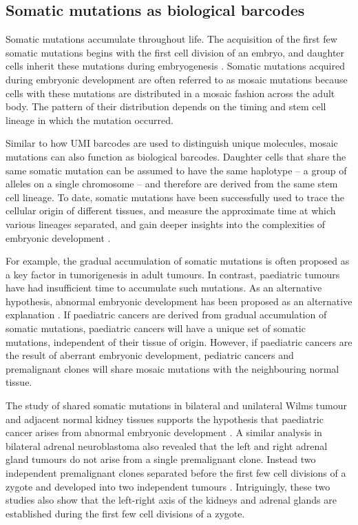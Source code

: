 \subsection{Somatic mutations as biological barcodes}

Somatic mutations accumulate throughout life. The acquisition of the first few somatic mutations begins with the first cell division of an embryo, and daughter cells inherit these mutations during embryogenesis \cite{Ju2017-vw}. Somatic mutations acquired during embryonic development are often referred to as mosaic mutations because cells with these mutations are distributed in a mosaic fashion across the adult body. The pattern of their distribution depends on the timing and stem cell lineage in which the mutation occurred. 

Similar to how UMI barcodes are used to distinguish unique molecules, mosaic mutations can also function as biological barcodes. Daughter cells that share the same somatic mutation can be assumed to have the same haplotype – a group of alleles on a single chromosome – and therefore are derived from the same stem cell lineage. To date, somatic mutations have been successfully used to trace the cellular origin of different tissues, and measure the approximate time at which various lineages separated, and gain deeper insights into the complexities of embryonic development \cite{Behjati2014-gb}.

For example, the gradual accumulation of somatic mutations is often proposed as a key factor in tumorigenesis in adult tumours. In contrast, paediatric tumours have had insufficient time to accumulate such mutations. As an alternative hypothesis, abnormal embryonic development has been proposed as an alternative explanation \cite{Marshall2014-ec}. If paediatric cancers are derived from gradual accumulation of somatic mutations, paediatric cancers will have a unique set of somatic mutations, independent of their tissue of origin. However, if paediatric cancers are the result of aberrant embryonic development, pediatric cancers and premalignant clones will share mosaic mutations with the neighbouring normal tissue. 

The study of shared somatic mutations in bilateral and unilateral Wilms tumour and adjacent normal kidney tissues supports the hypothesis that paediatric cancer arises from abnormal embryonic development \cite{Coorens2019-zf}. A similar analysis in bilateral adrenal neuroblastoma also revealed that the left and right adrenal gland tumours do not arise from a single premalignant clone. Instead two independent premalignant clones separated before the first few cell divisions of a zygote and developed into two independent tumours \cite{Coorens2020-ut}. Intriguingly, these two studies also show that the left-right axis of the kidneys and adrenal glands are established during the first few cell divisions of a zygote.

